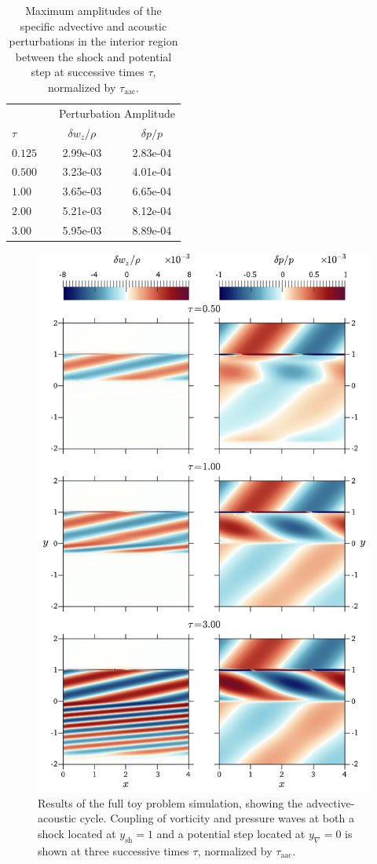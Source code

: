 \begin{table}\centering
\caption{Maximum amplitudes of the specific advective and acoustic perturbations in the interior region between the shock and potential step at successive times $\tau$, normalized by $\tau_\textrm{aac}$.}
\label{table:TP}
\begin{tabular}{@{}lcccc@{}}\toprule
& \phantom{abc} & \multicolumn{3}{c}{Perturbation Amplitude} \\
\cmidrule{3-5}
\phantom{al}$\tau$ && $\delta w_z/\rho$ & \phantom{abc} & $\delta p/p$ \\
\midrule
$0.125$ && 2.99e-03 && 2.83e-04 \\
$0.500$ && 3.23e-03 && 4.01e-04 \\
$1.00$ && 3.65e-03 && 6.65e-04 \\
$2.00$ && 5.21e-03 && 8.12e-04 \\
$3.00$ && 5.95e-03 && 8.89e-04 \\
\bottomrule
\end{tabular}
\end{table}

\begin{figure}
\centering
\includegraphics[width=12cm]{figures/TP}
\caption {Results of the full toy problem simulation, showing the advective-acoustic cycle. Coupling of vorticity and pressure waves at both a shock located at $y_{\textrm{sh}}=1$ and a potential step located at $y_\nabla=0$ is shown at three successive times $\tau$, normalized by $\tau_\textrm{aac}$.}
\label{fig:TP}
\end{figure}

